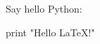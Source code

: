 \documentclass{article}
\begin{document}
Say hello Python:

\begin{python}
print "Hello \LaTeX!"
\end{python}
\end{document}
